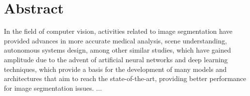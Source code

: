 \section*{Abstract}
\thispagestyle{empty}
In the field of computer vision, activities related to image segmentation have provided advances in more accurate medical analysis, scene understanding, autonomous systems design, among other similar studies, which have gained amplitude due to the advent of artificial neural networks and deep learning techniques, which provide a basis for the development of many models and architectures that aim to reach the state-of-the-art, providing better performance for image segmentation issues.
...